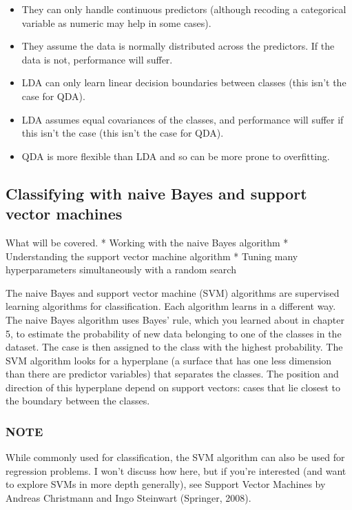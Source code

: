 \documentclass[
]{article}
\providecommand{\tightlist}{%
  \setlength{\itemsep}{0pt}\setlength{\parskip}{0pt}}
\begin{document}
\begin{itemize}
\tightlist
\item
  They can only handle continuous predictors (although recoding a
  categorical variable as numeric may help in some cases).
\item
  They assume the data is normally distributed across the predictors. If
  the data is not, performance will suffer.
\item
  LDA can only learn linear decision boundaries between classes (this
  isn't the case for QDA).
\item
  LDA assumes equal covariances of the classes, and performance will
  suffer if this isn't the case (this isn't the case for QDA).
\item
  QDA is more flexible than LDA and so can be more prone to overfitting.
\end{itemize}

\subsection{Classifying with naive Bayes and support vector
machines}\label{classifying-with-naive-bayes-and-support-vector-machines}

What will be covered. * Working with the naive Bayes algorithm *
Understanding the support vector machine algorithm * Tuning many
hyperparameters simultaneously with a random search

The naive Bayes and support vector machine (SVM) algorithms are
supervised learning algorithms for classification. Each algorithm learns
in a different way. The naive Bayes algorithm uses Bayes' rule, which
you learned about in chapter 5, to estimate the probability of new data
belonging to one of the classes in the dataset. The case is then
assigned to the class with the highest probability. The SVM algorithm
looks for a hyperplane (a surface that has one less dimension than there
are predictor variables) that separates the classes. The position and
direction of this hyperplane depend on support vectors: cases that lie
closest to the boundary between the classes.

\subsubsection{NOTE}\label{note-9}

While commonly used for classification, the SVM algorithm can also be
used for regression problems. I won't discuss how here, but if you're
interested (and want to explore SVMs in more depth generally), see
Support Vector Machines by Andreas Christmann and Ingo Steinwart
(Springer, 2008).
\end{document}
